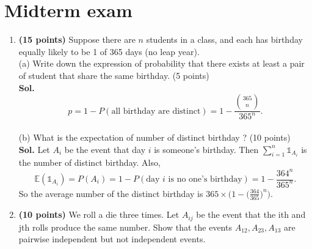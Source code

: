 \documentclass[12pt]{article}
\begin{document}
\section*{Midterm exam}
\begin{enumerate}
    \item \textbf{(15 points)} Suppose there are \(n\) students in a class, and each has birthday equally likely to be 1 of 365 days (no leap year).\\
    (a) Write down the expression of probability that there exists at least a pair of student that share the same birthday. (5 points)\\
    \textbf{Sol.}
\begin{equation*}    
    p=1-P(\text{all birthday are distinct})=1-\frac{\binom{365}{n}}{365^n}.
    \end{equation*}
    \\
    (b) What is the expectation of number of distinct birthday ? (10 points)\\
    \textbf{Sol.} Let $A_i$ be the event that day $i$ is someone's birthday. Then $\sum_{i=1}^n\mathds{1}_{A_i}$ is the number of distinct birthday. Also,
\begin{equation*}    
\mathbb{E}(\mathds{1}_{A_i})=P(A_i)=1-P(\text{day $i$ is no one's birthday})=1-\frac{364^n}{365^n}.
\end{equation*}
So the average number of the distinct birthday is $365\times\big(1-\big(\frac{364}{365}\big)^n\big)$.

    \item \textbf{(10 points)} We roll a die three times. Let \(A_{ij}\) be the event that the ith and jth rolls produce the same number.
    Show that the events \(A_{12}, A_{23}, A_{13}\) are pairwise independent but not independent events.


\end{enumerate}
\end{document}
